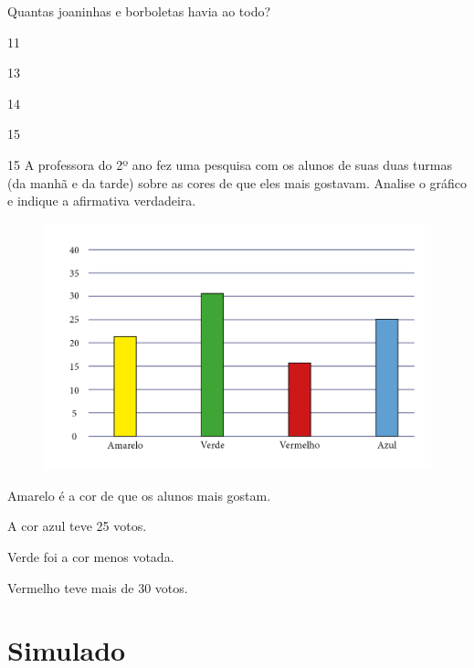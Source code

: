 Quantas joaninhas e borboletas havia ao todo?\enlargethispage{\baselineskip}

\begin{escolha}[itemsep=-5pt]
\begin{multicols}{4}
\item 11

\item 13

\item 14

\item 15
\end{multicols}
\end{escolha}

\num{15} A professora do 2º ano fez uma pesquisa com os alunos de suas duas
turmas (da manhã e da tarde) sobre as cores de que eles mais gostavam.
Analise o gráfico e indique a afirmativa verdadeira.

\begin{figure}[H]
\includegraphics[width=\textwidth]{./media/image136.png}
\end{figure}

\begin{escolha}[itemsep=-5pt]
\item Amarelo é a cor de que os alunos mais gostam.

\item A cor azul teve 25 votos.

\item Verde foi a cor menos votada.

\item Vermelho teve mais de 30 votos.
\end{escolha}

\chapter[Simulado 3]{Simulado}


